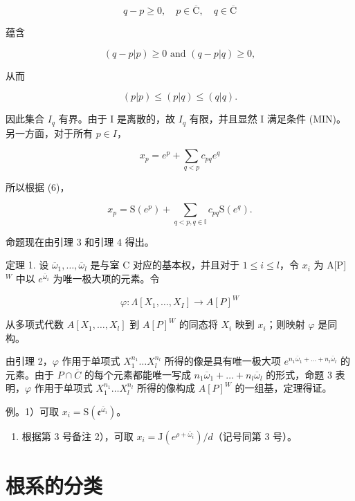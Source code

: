 \[
q - p \geqslant 0, \quad p \in \overline {{\mathrm{C}}}, \quad q \in \overline {{\mathrm{C}}}
\]

蕴含

\[
(q - p | p) \geqslant 0 \text { and } (q - p | q) \geqslant 0,
\]

从而

\[
(p | p) \leqslant (p | q) \leqslant (q | q).
\]

因此集合 \(I_{q}\) 有界。由于 I 是离散的，故 \(I_{q}\) 有限，并且显然 I 满足条件 (MIN)。另一方面，对于所有 \(p \in I\)，

\[
x _ {p} = e ^ {p} + \sum_ {q <   p} c _ {p q} e ^ {q}
\]

所以根据 (6)，

\[
x _ {p} = \mathrm{S} (e ^ {p}) + \sum_ {q <   p, q \in \mathbb {I}} c _ {p q} \mathrm{S} (e ^ {q}).
\]

命题现在由引理 3 和引理 4 得出。

定理 1. 设 \(\overline{\omega}_1, \ldots, \overline{\omega}_l\) 是与室 C 对应的基本权，并且对于 \(1 \leqslant i \leqslant l\)，令 \(x_i\) 为 A{[}P{]} \(^W\) 中以 \(e^{\overline{\omega}_i}\) 为唯一极大项的元素。令

\[
\varphi : \Lambda [ X _ {1}, \dots , X _ {I} ] \rightarrow A [ P ] ^ {W}
\]

从多项式代数 \(A[X_{1},\ldots,X_{l}]\) 到 \(A[P]^{W}\) 的同态将 \(X_{i}\) 映到 \(x_{i}\)；则映射 \(\varphi\) 是同构。

由引理 2，\(\varphi\) 作用于单项式 \(X_{1}^{n_{1}}\ldots X_{l}^{n_{l}}\) 所得的像是具有唯一极大项 \(e^{n_1\overline{\omega}_1 + \dots +n_l\overline{\omega}_l}\) 的元素。由于 \(P\cap \overline{C}\) 的每个元素都能唯一写成 \(n_1\overline{\omega}_1 + \dots +n_l\overline{\omega}_l\) 的形式，命题 3 表明，\(\varphi\) 作用于单项式 \(X_{1}^{n_{1}}\ldots X_{l}^{n_{l}}\) 所得的像构成 \(A[P]^W\) 的一组基，定理得证。

例。1）可取 \(x_{i} = \mathrm{S}(\mathfrak{e}^{\overline{\omega}_i})\)。

\begin{enumerate}
\def\labelenumi{\arabic{enumi})}
\setcounter{enumi}{1}
\tightlist
\item
  根据第 3 号备注 2），可取 \(x_{i} = \mathrm{J}(e^{\rho +\overline{\omega}_i}) / d\)（记号同第 3 号）。
\end{enumerate}

\section{根系的分类}

